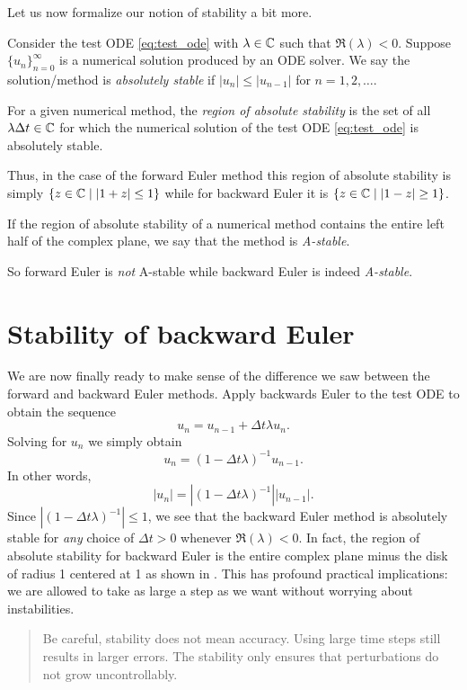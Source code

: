 Let us now formalize our notion of stability a bit more.

\begin{definition}
    Consider the test ODE \eqref{eq:test_ode} with $\lambda 
    \in \mathbb{C}$ such that $\Re(\lambda) < 0$. Suppose 
    $\{ u_n \}_{n=0}^\infty$ is a numerical solution 
    produced by an ODE solver. We say the solution/method is {\it absolutely 
    stable} if $|u_n| \le |u_{n-1}|$ for $n = 1, 2, \dots$.
\end{definition}

\begin{definition}
    For a given numerical method, the {\it region of absolute 
    stability} is the set of all $\lambda \Delta t \in \mathbb{C}$ 
    for which the numerical solution of the 
    test ODE \eqref{eq:test_ode} is absolutely stable.
\end{definition}

Thus, in the case of the forward Euler method this region of 
absolute stability is simply $\{ z \in \mathbb{C} \mid |1 + z| \le 1 \}$
while for backward Euler it is $\{ z \in \mathbb{C} \mid |1 - z| \ge 1 \}$.

\begin{definition}
    If the region of absolute stability of a numerical method 
    contains the entire left half of the complex plane, 
    we say that the method is {\it A-stable}.
\end{definition}

So forward Euler is {\it not} A-stable while backward 
Euler is indeed {\it A-stable}.

\section{Stability of backward Euler}
We are now finally ready to make sense of the difference 
we saw between the forward and backward Euler methods.
Apply backwards Euler to the test ODE to obtain the sequence 
\begin{equation*}
    u_n = u_{n-1} + \Delta t \lambda u_n.
\end{equation*}
Solving for $u_n$ we simply obtain 
\begin{equation*}
    u_n = (1 - \Delta t \lambda)^{-1} u_{n-1}.
\end{equation*}
In other words, 
\begin{equation*}
    |u_n| = |(1 - \Delta t \lambda)^{-1}| |u_{n-1}|.
\end{equation*}
Since $|(1 - \Delta t \lambda)^{-1}| \le 1$,
we see that the backward Euler method is absolutely stable 
for {\it any} choice of $\Delta t >0$ whenever 
$\Re(\lambda) < 0$. In fact, the region of absolute 
stability for backward Euler is the entire 
complex plane minus the disk of radius 1 centered at 1
as shown in . This has 
profound practical implications: we are allowed to take as large
a step as we want without worrying about instabilities. 

\begin{quote}
    Be careful, stability does not mean accuracy. Using large time 
    steps still results in larger errors. The stability 
    only ensures that perturbations do not grow uncontrollably.
\end{quote}



% 
% 